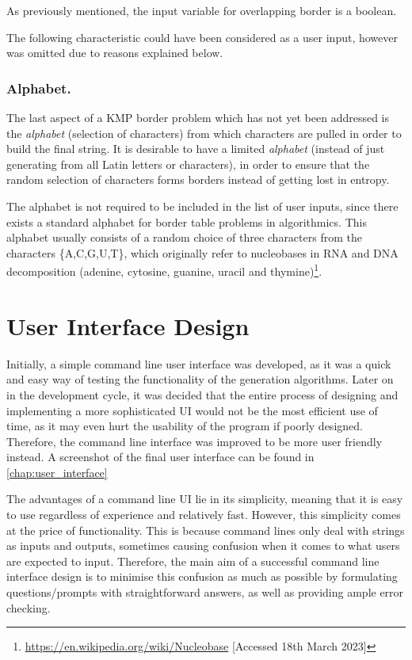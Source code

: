\documentclass{l4proj}
\begin{document}
As previously mentioned, the input variable for overlapping border is a boolean.

The following characteristic could have been considered as a user input, however was omitted due to reasons explained below.

\subsubsection{Alphabet.}
\label{sec:alphabet}

The last aspect of a KMP border problem which has not yet been addressed is the \emph{alphabet} (selection of characters) from which characters are pulled in order to build the final string. It is desirable to have a limited \emph{alphabet} (instead of just generating from all Latin letters or characters), in order to ensure that the random selection of characters forms borders instead of getting lost in entropy.
 
The alphabet is not required to be included in the list of user inputs, since there exists a standard alphabet for border table problems in algorithmics. This alphabet usually consists of a random choice of three characters from the characters \{A,C,G,U,T\}, which originally refer to nucleobases in RNA and DNA decomposition (adenine, cytosine, guanine, uracil and thymine)\footnote{\url{https://en.wikipedia.org/wiki/Nucleobase} [Accessed 18th March 2023]}.

\section{User Interface Design}

Initially, a simple command line user interface was developed, as it was a quick and easy way of testing the functionality of the generation algorithms. Later on in the development cycle, it was decided that the entire process of designing and implementing a more sophisticated UI would not be the most efficient use of time, as it may even hurt the usability of the program if poorly designed. Therefore, the command line interface was improved to be more user friendly instead. A screenshot of the final user interface can be found in \autoref{chap:user_interface}

The advantages of a command line UI lie in its simplicity, meaning that it is easy to use regardless of experience and relatively fast. However, this simplicity comes at the price of functionality. This is because command lines only deal with strings as inputs and outputs, sometimes causing confusion when it comes to what users are expected to input. Therefore, the main aim of a successful command line interface design is to minimise this confusion as much as possible by formulating questions/prompts with straightforward answers, as well as providing ample error checking.
\end{document}
